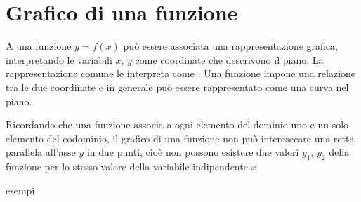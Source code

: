 \documentclass[letterpaper,10pt,italian]{jupyterBook}
\begin{document}
\section{Grafico di una funzione}
\label{\detokenize{ch/precalculus/real-functions:grafico-di-una-funzione}}\label{\detokenize{ch/precalculus/real-functions:math-hs-precalculus-real-functions-plot}}
\sphinxAtStartPar
A una funzione \(y = f(x)\) può essere associata una rappresentazione grafica, interpretando le variabili \(x\), \(y\) come coordinate che descrivono il piano. La rappresentazione comune le interpreta come . Una funzione impone una relazione tra le due coordinate e in generale può essere rappresentato come una curva nel piano.

\sphinxAtStartPar
Ricordando che una funzione associa a ogni elemento del dominio uno e un solo elemento del codominio, il grafico di una funzione non può interesecare una retta parallela all’asse \(y\) in due punti, cioè non possono esistere due valori \(y_1\), \(y_2\) della funzione per lo stesso valore della variabile indipendente \(x\).

\sphinxAtStartPar
{} esempi
\end{document}

